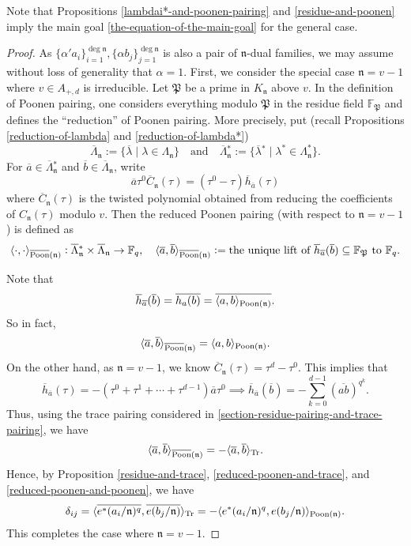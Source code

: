 \documentclass[11pt]{amsart}
\theoremstyle{plain}
\theoremstyle{definition}
\theoremstyle{remark}
\numberwithin{equation}{section}
\newcommand{\FF}{\mathbb{F}}
\newcommand{\nfk}{\mathfrak{n}}
\newcommand{\Pfk}{\mathfrak{P}}
\newcommand{\ovl}{\overline}
\newcommand{\sbe}{\subseteq}
\newcommand{\ang}[1]{\langle #1 \rangle}
\newcommand{\Fq}{\FF_q}
\DeclarePairedDelimiter{\angtr}{\langle}{\rangle_\textnormal{Tr}}
\begin{document}
	Note that Propositions \ref{lambdai*-and-poonen-pairing} and \ref{residue-and-poonen} imply the main goal \eqref{the-equation-of-the-main-goal} for the general case.
	
	\begin{proof}
		As $\{\alpha' a_i\}_{i=1}^{\deg\nfk}, \{\alpha b_j\}_{j=1}^{\deg\nfk}$ is also a pair of $\nfk$-dual families, we may assume without loss of generality that $\alpha = 1$.
		First, we consider the special case $\nfk = v - 1$ where $v \in A_{+,d}$ is irreducible.
		Let $\Pfk$ be a prime in $K_\nfk$ above $v$.
		In the definition of Poonen pairing, one considers everything modulo $\Pfk$ in the residue field $\FF_\Pfk$ and defines the “reduction” of Poonen pairing.
		More precisely, put (recall Propositions \ref{reduction-of-lambda} and \ref{reduction-of-lambda*})
		$$
		\ovl{\Lambda}_\nfk := \{ \ovl{\lambda} \mid \lambda \in \Lambda_\nfk \}
		\quad
		\text{and}
		\quad
		\ovl{\Lambda}{}^*_\nfk := \{ \ovl{\lambda}{}^* \mid \lambda^* \in \Lambda_\nfk^* \}.
		$$
		For $\ovl{a} \in \ovl{\Lambda}{}^*_\nfk$ and $\ovl{b} \in \ovl{\Lambda}_\nfk$, write
		$$
		\ovl{a} \tau^0 \ovl{C}_\nfk(\tau) = (\tau^0 - \tau) \ovl{h}_{\ovl{a}}(\tau)
		$$
		where $\ovl{C}_\nfk(\tau)$ is the twisted polynomial obtained from reducing the coefficients of $C_\nfk(\tau)$ modulo $v$.
		Then the reduced Poonen pairing (with respect to $\nfk = v-1$) is defined as
		$$
		\ang{\cdot,\cdot}_{\ovl{\textnormal{Poon}}(\nfk)}: \ovl{\Lambda}{}^*_\nfk \times \ovl{\Lambda}_\nfk \to \Fq,
		\quad 
		\ang{\ovl{a},\ovl{b}}_{\ovl{\textnormal{Poon}}(\nfk)}
		:= \text{the unique lift of }
		\ovl{h}_{\ovl{a}} (\ovl{b}) \sbe \FF_{\Pfk}
		\text{ to }
		\Fq.
		$$
		
		Note that
		$$
		\ovl{h}_{\ovl{a}} (\ovl{b})
		= \ovl{h_a(b)}
		= \ovl{\ang{a,b}_{\textnormal{Poon}(\nfk)}}.
		$$
		So in fact,
		\begin{equation}    \label{reduced-poonen-and-poonen}
			\ang{\ovl{a},\ovl{b}}_{\ovl{\textnormal{Poon}}(\nfk)}
			= \ang{a,b}_{\textnormal{Poon}(\nfk)}.
		\end{equation}
		On the other hand, as $\nfk = v-1$, we know $\ovl{C}_\nfk (\tau) = \tau^d - \tau^0$.
		This implies that
		$$
		\ovl{h}_{\ovl{a}} (\tau) = -(\tau^0 + \tau^1 + \cdots + \tau^{d-1}) \ovl{a}\tau^0
		\implies
		\ovl{h}_{\ovl{a}} (\ovl{b})
		= -\sum_{k=0}^{d-1} (\ovl{ab})^{q^k}.
		$$
		Thus, using the trace pairing considered in \ref{section-residue-pairing-and-trace-pairing}, we have
		\begin{equation}       \label{reduced-poonen-and-trace}
			\ang{\ovl{a},\ovl{b}}_{\ovl{\textnormal{Poon}}(\nfk)}
			= -\angtr{\ovl{a},\ovl{b}}.
		\end{equation}
		Hence, by Proposition \ref{residue-and-trace}, \eqref{reduced-poonen-and-trace}, and \eqref{reduced-poonen-and-poonen}, we have
		$$
		\delta_{ij}
		= \angtr{\ovl{e^*(a_i/\nfk)^q},\ovl{e(b_j/\nfk)}}
		= -\ang{e^*(a_i/\nfk)^q,e(b_j/\nfk)}_{\textnormal{Poon}(\nfk)}.
		$$
		This completes the case where $\nfk = v-1$.
		

\end{proof}
\end{document}
